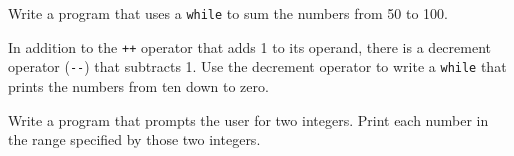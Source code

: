 %
%
\begin{question}
Write a program that uses a \verb|while| to sum the numbers from
50 to 100.
\end{question}

\begin{question}
In addition to the \verb|++| operator that adds 1 to its operand,
there is a decrement operator (\verb|--|) that subtracts 1. Use the decrement
operator to write a \verb|while| that prints the numbers from ten down to zero.
\end{question}

\begin{question}
Write a program that prompts the user for two integers.
Print each number in the range specified by those two integers.
\end{question}
